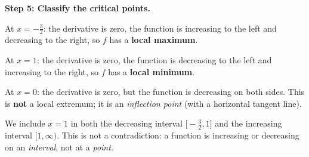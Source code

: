 \begin{example}
\textbf{Step 5: Classify the critical points.}

At $x = -\frac{3}{2}$: the derivative is zero, the function is increasing to the left and decreasing to the right, so $f$ has a \textbf{local maximum}.

At $x = 1$: the derivative is zero, the function is decreasing to the left and increasing to the right, so $f$ has a \textbf{local minimum}.

At $x = 0$: the derivative is zero, but the function is decreasing on both sides.  This is \textbf{not} a local extremum; it is an \emph{inflection point} (with a horizontal tangent line).

\begin{remark}
We include $x = 1$ in both the decreasing interval $\bigl[-\frac{3}{2}, 1\bigr]$ and the increasing interval $[1, \infty)$.  This is not a contradiction: a function is increasing or decreasing on an \emph{interval}, not at a \emph{point}.
\end{remark}
\end{example}
